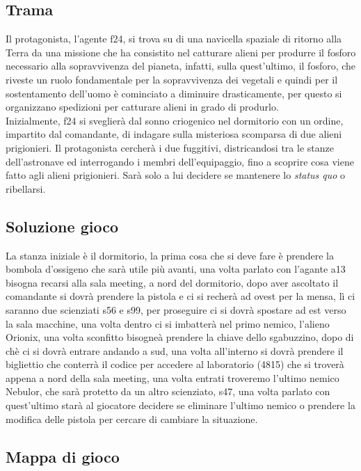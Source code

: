 \documentclass[italian,12pt,a4paper]{article}
\begin{document}
	\subsection{Trama}
		Il protagonista, l’agente f24, si trova su di una navicella spaziale di ritorno alla Terra da una missione che ha consistito nel catturare alieni per produrre il fosforo necessario alla sopravvivenza del pianeta, infatti, sulla quest'ultimo, il fosforo, che riveste un ruolo fondamentale per la sopravvivenza dei vegetali e quindi per il sostentamento dell’uomo è cominciato a diminuire drasticamente, per questo si organizzano spedizioni per catturare alieni in grado di produrlo. \\
		\linebreak
		Inizialmente, f24 si sveglierà dal sonno criogenico nel dormitorio con un ordine, impartito dal comandante, di indagare sulla misteriosa scomparsa di due alieni prigionieri. Il protagonista cercherà i due fuggitivi, districandosi tra le stanze dell’astronave ed interrogando i membri dell’equipaggio, fino a scoprire cosa viene fatto agli alieni prigionieri. Sarà solo a lui decidere se mantenere lo \textit{status quo} o ribellarsi.
	\subsection{Soluzione gioco}
	
		La stanza iniziale è il dormitorio, la prima cosa che si deve fare è prendere la bombola d'ossigeno che sarà utile più avanti, una volta parlato con l'agante a13 bisogna recarsi alla sala meeting, a nord del dormitorio, dopo aver ascoltato il comandante si dovrà prendere la pistola e ci si recherà ad ovest per la mensa, lì ci saranno due scienziati s56 e s99, per proseguire ci si dovrà spostare ad est verso la sala macchine, una volta dentro ci si imbatterà nel primo nemico, l'alieno Orionix, una volta sconfitto bisogneà prendere la chiave dello sgabuzzino, dopo di chè ci si dovrà entrare andando a sud, una volta all'interno si dovrà prendere il bigliettio che conterrà il codice per accedere al laboratorio (4815) che si troverà appena a nord della sala meeting, una volta entrati troveremo l'ultimo nemico Nebulor, che sarà protetto da un altro scienziato, s47, una volta parlato con quest'ultimo starà al giocatore decidere se eliminare l'ultimo nemico o prendere la modifica delle pistola per cercare di cambiare la situazione.
		
		\subsection{Mappa di gioco}
		
\end{document}
